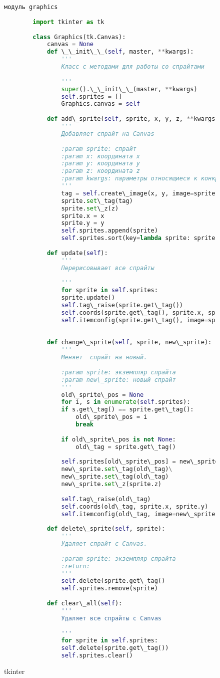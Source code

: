 \begin{figure}[H]
	\begin{lstlisting}[language=Python]
		модуль graphics
		
		import tkinter as tk
		
		class Graphics(tk.Canvas):
			canvas = None
			def \_\_init\_\_(self, master, **kwargs):
				'''
				Класс с методами для работы со спрайтами
				
				'''
				super().\_\_init\_\_(master, **kwargs)
				self.sprites = []
				Graphics.canvas = self
			
			def add\_sprite(self, sprite, x, y, z, **kwargs):
				'''
				Добавляет спрайт на Canvas
				
				:param sprite: спрайт
				:param x: координата x
				:param y: координата y
				:param z: координата z
				:param kwargs: параметры относящиеся к конкретному изображению в tkinter
				'''
				tag = self.create\_image(x, y, image=sprite.image, anchor='center', **kwargs)
				sprite.set\_tag(tag)
				sprite.set\_z(z)
				sprite.x = x
				sprite.y = y
				self.sprites.append(sprite)
				self.sprites.sort(key=lambda sprite: sprite.z)
			
			def update(self):
				'''
				Перерисовывает все спрайты
				
				'''
				for sprite in self.sprites:
				sprite.update()
				self.tag\_raise(sprite.get\_tag())
				self.coords(sprite.get\_tag(), sprite.x, sprite.y)
				self.itemconfig(sprite.get\_tag(), image=sprite.image)
				
			
			def change\_sprite(self, sprite, new\_sprite):
				'''
				Меняет  спрайт на новый.
				
				:param sprite: экземпляр спрайта
				:param new\_sprite: новый спрайт
				'''
				old\_sprite\_pos = None
				for i, s in enumerate(self.sprites):
				if s.get\_tag() == sprite.get\_tag():
					old\_sprite\_pos = i
					break
				
				if old\_sprite\_pos is not None:
					old\_tag = sprite.get\_tag()
					
				self.sprites[old\_sprite\_pos] = new\_sprite
				new\_sprite.set\_tag(old\_tag)\
				new\_sprite.set\_tag(old\_tag)
				new\_sprite.set\_z(sprite.z)
				
				self.tag\_raise(old\_tag)
				self.coords(old\_tag, sprite.x, sprite.y)
				self.itemconfig(old\_tag, image=new\_sprite.image)
			
			def delete\_sprite(self, sprite):
				'''
				Удаляет спрайт с Canvas.
				
				:param sprite: экземпляр спрайта
				:return:
				'''
				self.delete(sprite.get\_tag()
				self.sprites.remove(sprite)
			
			def clear\_all(self):
				'''
				Удаляет все спрайты с Canvas
				
				'''
				for sprite in self.sprites:
				self.delete(sprite.get\_tag())
				self.sprites.clear()
	\end{lstlisting}  
	\caption{tkinter}
	\label{tkinter2:image}
\end{figure}


